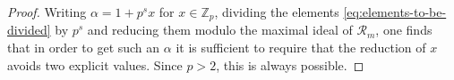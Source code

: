\documentclass[10pt,a4paper]{amsart}
\newcommand{\Z}{\numberset{Z}}
\newcommand{\numberset}{\mathbb}
\begin{document}
\begin{proof}
    Writing $\alpha=1+p^{s}x$ for $x\in\Z_p$, dividing the elements \eqref{eq:elements-to-be-divided} by $p^s$ and reducing them modulo the maximal ideal of $\mathcal{R}_m$, one finds that in order to get such an $\alpha$ it is sufficient to require that the reduction of $x$ avoids two explicit values. Since $p>2$, this is always possible.
\end{proof}
\end{document}
